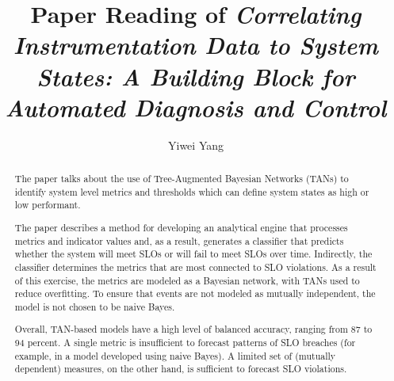 \documentclass[acmlarge]{acmart}
\begin{document}
\title{Paper Reading of \textit{Correlating Instrumentation Data to System States: A Building Block for Automated Diagnosis and Control}}

\author{Yiwei Yang}

\renewcommand{\shortauthors}{Yiwei Yang}

\begin{abstract}
  The paper \cite{cohen2004correlating} talks about the use of Tree-Augmented Bayesian Networks (TANs) to identify system level metrics and thresholds which can define system states as high or low performant.

  The paper describes a method for developing an analytical engine that processes metrics and indicator values and, as a result, generates a classifier that predicts whether the system will meet SLOs or will fail to meet SLOs over time. Indirectly, the classifier determines the metrics that are most connected to SLO violations.
  As a result of this exercise, the metrics are modeled as a Bayesian network, with TANs used to reduce overfitting. To ensure that events are not modeled as mutually independent, the model is not chosen to be naive Bayes.

  Overall, TAN-based models have a high level of balanced accuracy, ranging from 87 to 94 percent. A single metric is insufficient to forecast patterns of SLO breaches (for example, in a model developed using naive Bayes). A limited set of (mutually dependent) measures, on the other hand, is sufficient to forecast SLO violations.
\end{abstract}
\end{document}
